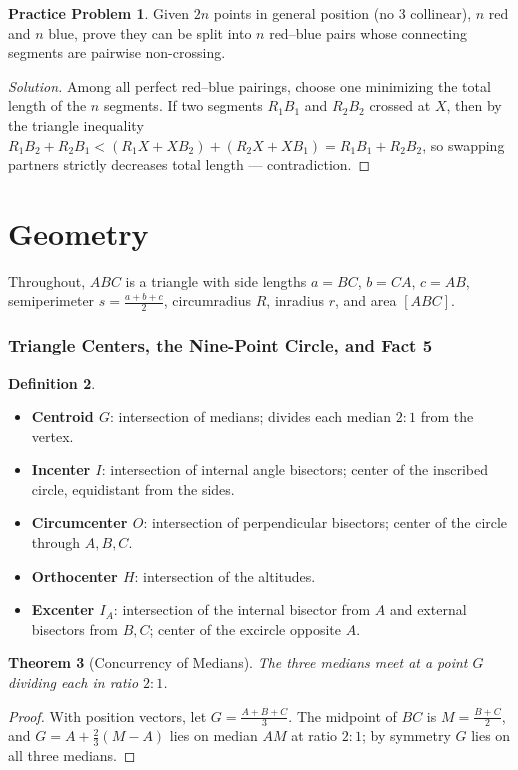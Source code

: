 \documentclass[11pt]{article}
\theoremstyle{plain}
\newtheorem{theorem}{Theorem}[section]
\theoremstyle{definition}
\newtheorem{definition}[theorem]{Definition}
\newtheorem{problem}[theorem]{Practice Problem}
\newenvironment{solution}{\begin{proof}[Solution]}{\end{proof}}
\begin{document}
\begin{problem}
Given $2n$ points in general position (no 3 collinear), $n$ red and $n$ blue,
prove they can be split into $n$ red--blue pairs whose connecting segments are
pairwise non-crossing.
\end{problem}
\begin{solution}
Among all perfect red--blue pairings, choose one minimizing the total length of
the $n$ segments. If two segments $R_1B_1$ and $R_2B_2$ crossed at $X$, then by the triangle inequality
$R_1B_2 + R_2B_1 < (R_1X + XB_2) + (R_2X + XB_1) = R_1B_1 + R_2B_2$,
so swapping partners strictly decreases total length --- contradiction.
\end{solution}
\part{Geometry}

Throughout, $ABC$ is a triangle with side lengths $a=BC$, $b=CA$, $c=AB$,
semiperimeter $s = \frac{a+b+c}{2}$, circumradius $R$, inradius $r$, and area $[ABC]$.

\section{Triangle Centers, the Nine-Point Circle, and Fact 5}

\begin{definition}\leavevmode
\begin{itemize}
\item \textbf{Centroid $G$}: intersection of medians; divides each median $2:1$
from the vertex.
\item \textbf{Incenter $I$}: intersection of internal angle bisectors; center of
the inscribed circle, equidistant from the sides.
\item \textbf{Circumcenter $O$}: intersection of perpendicular bisectors;
center of the circle through $A,B,C$.
\item \textbf{Orthocenter $H$}: intersection of the altitudes.
\item \textbf{Excenter $I_A$}: intersection of the internal bisector from $A$
and external bisectors from $B, C$; center of the excircle opposite $A$.
\end{itemize}
\end{definition}

\begin{theorem}[Concurrency of Medians]
The three medians meet at a point $G$ dividing each in ratio $2:1$.
\end{theorem}
\begin{proof}
With position vectors, let $G = \frac{A+B+C}{3}$. The midpoint of $BC$ is
$M = \frac{B+C}{2}$, and $G = A + \frac{2}{3}(M - A)$ lies on median $AM$ at
ratio $2:1$; by symmetry $G$ lies on all three medians.
\end{proof}
\end{document}
